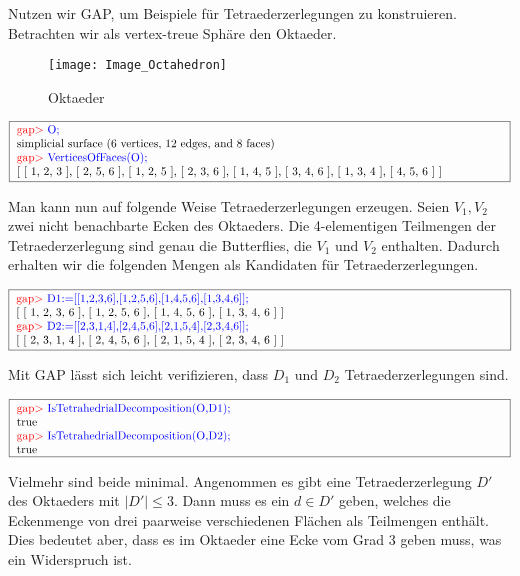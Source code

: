\documentclass[12pt,titlepage,twoside,cleardoublepage]{article}
\theoremstyle{nummermitklammern}
\numberwithin{equation}{section}
\begin{document}
Nutzen wir GAP, um Beispiele für Tetraederzerlegungen zu konstruieren. Betrachten wir als vertex-treue Sphäre den Oktaeder.
\begin{figure}[H]
\begin{center}
\texttt{[image: Image\_Octahedron]}
\end{center}
\caption{Oktaeder}
\end{figure}
\begin{center}
$\fbox{
\parbox{15cm}{
\textcolor{red}{gap$>$} \textcolor{blue}{O;}\newline 
simplicial surface (6 vertices, 12 edges, and 8 faces) \newline
\textcolor{red}{gap$>$} \textcolor{blue}{VerticesOfFaces(O);}\newline
[ [ 1, 2, 3 ], [ 2, 5, 6 ], [ 1, 2, 5 ], [ 2, 3, 6 ], [ 1, 4, 5 ],  [ 3, 4, 6 ], [ 1, 3, 4 ], [ 4, 5, 6 ] ]
}}$
\end{center}
Man kann nun auf folgende Weise Tetraederzerlegungen erzeugen.
Seien $V_1,V_2$ zwei nicht benachbarte Ecken des Oktaeders.
Die 4-elementigen Teilmengen der Tetraederzerlegung sind genau die Butterflies, die $V_1$ und $V_2$ enthalten. Dadurch erhalten wir die folgenden Mengen als Kandidaten für Tetraederzerlegungen.
\begin{center}
$\fbox{
\parbox{15cm}{
\textcolor{red}{gap$>$}  \textcolor{blue}{D1:=[[1,2,3,6],[1,2,5,6],[1,4,5,6],[1,3,4,6]];}\newline
[ [ 1, 2, 3, 6 ], [ 1, 2, 5, 6 ], [ 1, 4, 5, 6 ], [ 1, 3, 4, 6 ] ]\newline
\textcolor{red}{gap$>$}  \textcolor{blue}{D2:=[[2,3,1,4],[2,4,5,6],[2,1,5,4],[2,3,4,6]];}\newline
[ [ 2, 3, 1, 4 ], [ 2, 4, 5, 6 ], [ 2, 1, 5, 4 ], [ 2, 3, 4, 6 ] ]
}}$
\end{center}
Mit GAP lässt sich leicht verifizieren, dass $D_1$ und $D_2$  Tetraederzerlegungen sind.
\begin{center}
$\fbox{
\parbox{15cm}{
\textcolor{red}{gap$>$}  \textcolor{blue}{IsTetrahedrialDecomposition(O,D1);}\newline
 true \newline
\textcolor{red}{gap$>$}  \textcolor{blue}{IsTetrahedrialDecomposition(O,D2);}\newline
 true
 }}$ 
 \end{center}
Vielmehr sind beide minimal. Angenommen es gibt eine Tetraederzerlegung $D'$ des Oktaeders mit $\vert D' \vert\leq 3$. Dann muss es ein $d\in D'$ geben, welches die Eckenmenge von drei paarweise verschiedenen Flächen als Teilmengen enthält. Dies bedeutet aber, dass es im Oktaeder eine Ecke vom Grad 3 geben muss, was ein Widerspruch ist. 
\end{document}
